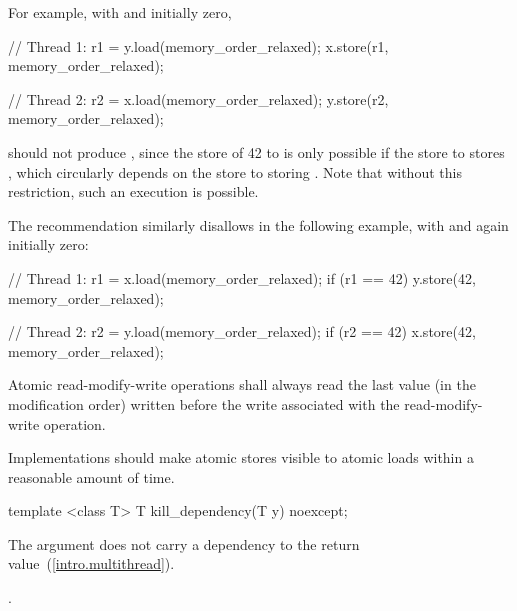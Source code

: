 \begin{note} For example, with  and  initially zero,

\begin{codeblock}
// Thread 1:
r1 = y.load(memory_order_relaxed);
x.store(r1, memory_order_relaxed);
\end{codeblock}

\begin{codeblock}
// Thread 2:
r2 = x.load(memory_order_relaxed);
y.store(r2, memory_order_relaxed);
\end{codeblock}

should not produce , since the store of 42 to  is only
possible if the store to  stores , which circularly depends on the
store to  storing . Note that without this restriction, such an
execution is possible.
\end{note}

\pnum
\begin{note} The recommendation similarly disallows  in the
following example, with  and  again initially zero:

\begin{codeblock}
// Thread 1:
r1 = x.load(memory_order_relaxed);
if (r1 == 42) y.store(42, memory_order_relaxed);
\end{codeblock}

\begin{codeblock}
// Thread 2:
r2 = y.load(memory_order_relaxed);
if (r2 == 42) x.store(42, memory_order_relaxed);
\end{codeblock}

\end{note}

\pnum
Atomic read-modify-write operations shall always read the last value
(in the modification order) written before the write associated with
the read-modify-write operation.

\pnum
Implementations should make atomic stores visible to atomic loads within a reasonable
amount of time.

%
\begin{itemdecl}
template <class T>
  T kill_dependency(T y) noexcept;
\end{itemdecl}

\begin{itemdescr}
\pnum
\effects The argument does not carry a dependency to the return
value~(\ref{intro.multithread}).

\pnum
\returns {}.
\end{itemdescr}


